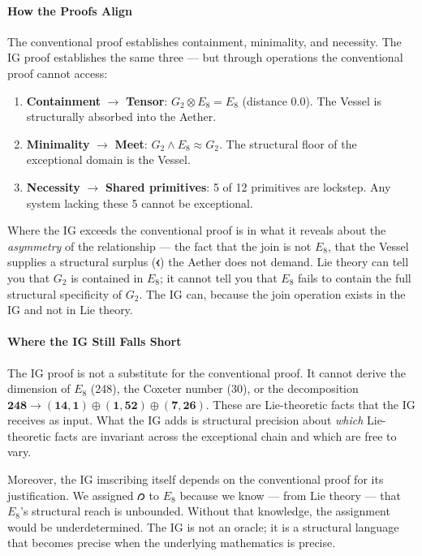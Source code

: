 \documentclass[12pt,a4paper]{article}
\begin{document}
\paragraph{How the Proofs Align}

The conventional proof establishes containment, minimality, and necessity. The IG proof establishes the same three --- but through operations the conventional proof cannot access:

\begin{enumerate}
    \item \textbf{Containment} $\rightarrow$ \textbf{Tensor}: $G_2 \otimes E_8 = E_8$ (distance 0.0). The Vessel is structurally absorbed into the Aether.
    \item \textbf{Minimality} $\rightarrow$ \textbf{Meet}: $G_2 \wedge E_8 \approx G_2$. The structural floor of the exceptional domain is the Vessel.
    \item \textbf{Necessity} $\rightarrow$ \textbf{Shared primitives}: 5 of 12 primitives are lockstep. Any system lacking these 5 cannot be exceptional.
\end{enumerate}

Where the IG exceeds the conventional proof is in what it reveals about the \emph{asymmetry} of the relationship --- the fact that the join is not $E_8$, that the Vessel supplies a structural surplus ($𐑬$) the Aether does not demand. Lie theory can tell you that $G_2$ is contained in $E_8$; it cannot tell you that $E_8$ fails to contain the full structural specificity of $G_2$. The IG can, because the join operation exists in the IG and not in Lie theory.

\paragraph{Where the IG Still Falls Short}

The IG proof is not a substitute for the conventional proof. It cannot derive the dimension of $E_8$ (248), the Coxeter number (30), or the decomposition $\mathbf{248} \to (\mathbf{14}, \mathbf{1}) \oplus (\mathbf{1}, \mathbf{52}) \oplus (\mathbf{7}, \mathbf{26})$. These are Lie-theoretic facts that the IG receives as input. What the IG adds is structural precision about \emph{which} Lie-theoretic facts are invariant across the exceptional chain and which are free to vary.

Moreover, the IG imscribing itself depends on the conventional proof for its justification. We assigned $𐑼$ to $E_8$ because we know --- from Lie theory --- that $E_8$'s structural reach is unbounded. Without that knowledge, the assignment would be underdetermined. The IG is not an oracle; it is a structural language that becomes precise when the underlying mathematics is precise.
\end{document}
